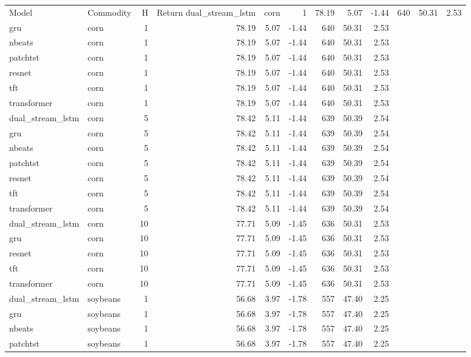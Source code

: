 \begin{tabular}{llrrrrrrr}
\toprule
Model & Commodity & H & Return %
\midrule
dual_stream_lstm & corn & 1 & 78.19 & 5.07 & -1.44 & 640 & 50.31 & 2.53 \\
gru & corn & 1 & 78.19 & 5.07 & -1.44 & 640 & 50.31 & 2.53 \\
nbeats & corn & 1 & 78.19 & 5.07 & -1.44 & 640 & 50.31 & 2.53 \\
patchtst & corn & 1 & 78.19 & 5.07 & -1.44 & 640 & 50.31 & 2.53 \\
resnet & corn & 1 & 78.19 & 5.07 & -1.44 & 640 & 50.31 & 2.53 \\
tft & corn & 1 & 78.19 & 5.07 & -1.44 & 640 & 50.31 & 2.53 \\
transformer & corn & 1 & 78.19 & 5.07 & -1.44 & 640 & 50.31 & 2.53 \\
dual_stream_lstm & corn & 5 & 78.42 & 5.11 & -1.44 & 639 & 50.39 & 2.54 \\
gru & corn & 5 & 78.42 & 5.11 & -1.44 & 639 & 50.39 & 2.54 \\
nbeats & corn & 5 & 78.42 & 5.11 & -1.44 & 639 & 50.39 & 2.54 \\
patchtst & corn & 5 & 78.42 & 5.11 & -1.44 & 639 & 50.39 & 2.54 \\
resnet & corn & 5 & 78.42 & 5.11 & -1.44 & 639 & 50.39 & 2.54 \\
tft & corn & 5 & 78.42 & 5.11 & -1.44 & 639 & 50.39 & 2.54 \\
transformer & corn & 5 & 78.42 & 5.11 & -1.44 & 639 & 50.39 & 2.54 \\
dual_stream_lstm & corn & 10 & 77.71 & 5.09 & -1.45 & 636 & 50.31 & 2.53 \\
gru & corn & 10 & 77.71 & 5.09 & -1.45 & 636 & 50.31 & 2.53 \\
resnet & corn & 10 & 77.71 & 5.09 & -1.45 & 636 & 50.31 & 2.53 \\
tft & corn & 10 & 77.71 & 5.09 & -1.45 & 636 & 50.31 & 2.53 \\
transformer & corn & 10 & 77.71 & 5.09 & -1.45 & 636 & 50.31 & 2.53 \\
dual_stream_lstm & soybeans & 1 & 56.68 & 3.97 & -1.78 & 557 & 47.40 & 2.25 \\
gru & soybeans & 1 & 56.68 & 3.97 & -1.78 & 557 & 47.40 & 2.25 \\
nbeats & soybeans & 1 & 56.68 & 3.97 & -1.78 & 557 & 47.40 & 2.25 \\
patchtst & soybeans & 1 & 56.68 & 3.97 & -1.78 & 557 & 47.40 & 2.25 \\

\end{tabular}
